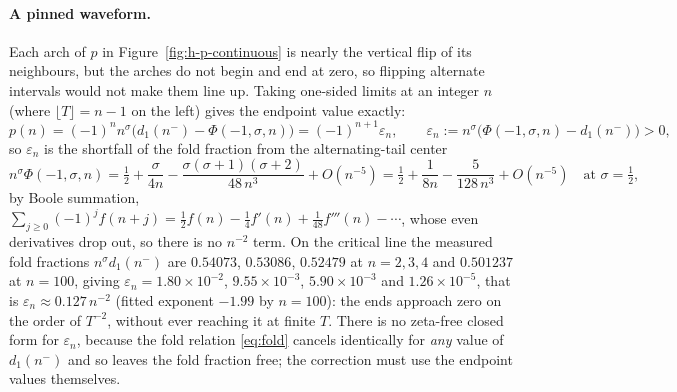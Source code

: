 \documentclass[11pt]{article}
\theoremstyle{definition}
\begin{document}
\paragraph{A pinned waveform.} Each arch of $p$ in
Figure~\ref{fig:h-p-continuous} is nearly the vertical flip of its
neighbours, but the arches do not begin and end at zero, so flipping alternate
intervals would not make them line up. Taking one-sided limits at an integer
$n$ (where $\lfloor T\rfloor=n-1$ on the left) gives the endpoint value
exactly:
\begin{equation}\label{eq:eps-n}
p(n)=(-1)^{n}n^{\sigma}\bigl(d_1(n^-)-\Phi(-1,\sigma,n)\bigr)
=(-1)^{n+1}\varepsilon_n,
\qquad
\varepsilon_n:=n^{\sigma}\bigl(\Phi(-1,\sigma,n)-d_1(n^-)\bigr)>0,
\end{equation}
so $\varepsilon_n$ is the shortfall of the fold fraction from the
alternating-tail center
\begin{equation}\label{eq:alt-tail-center}
n^{\sigma}\Phi(-1,\sigma,n)
=\tfrac12+\frac{\sigma}{4n}-\frac{\sigma(\sigma+1)(\sigma+2)}{48\,n^{3}}
+O(n^{-5})
=\tfrac12+\frac{1}{8n}-\frac{5}{128\,n^{3}}+O(n^{-5})
\quad\text{at }\sigma=\tfrac12,
\end{equation}
by Boole summation, $\sum_{j\ge0}(-1)^{j}f(n+j)=\tfrac12f(n)-\tfrac14f'(n)
+\tfrac1{48}f'''(n)-\cdots$, whose even derivatives drop out, so there is no
$n^{-2}$ term. On the critical line the measured fold fractions
$n^{\sigma}d_1(n^-)$ are $0.54073$, $0.53086$, $0.52479$ at $n=2,3,4$ and
$0.501237$ at $n=100$, giving $\varepsilon_n=1.80\times10^{-2}$,
$9.55\times10^{-3}$, $5.90\times10^{-3}$ and $1.26\times10^{-5}$, that is
$\varepsilon_n\approx0.127\,n^{-2}$ (fitted exponent $-1.99$ by $n=100$): the
ends approach zero on the order of $T^{-2}$, without ever reaching it at
finite $T$. There is no zeta-free closed
form for $\varepsilon_n$, because the fold relation \eqref{eq:fold} cancels
identically for \emph{any} value of $d_1(n^-)$ and so leaves the fold fraction
free; the correction must use the endpoint values themselves.
\end{document}
